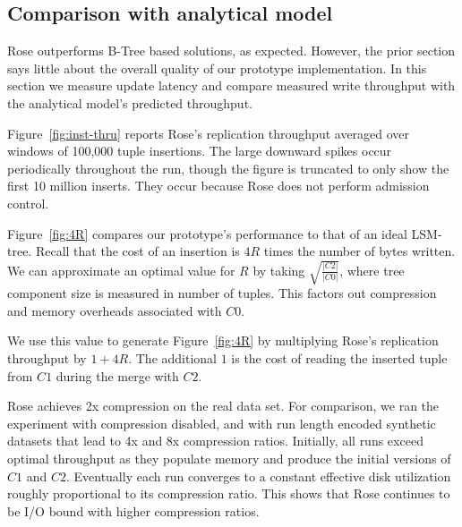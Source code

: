 \documentclass{vldb}
\newcommand{\rows}{Rose\xspace}
\newcommand{\rowss}{Rose's\xspace}
\begin{document}

\subsection{Comparison with analytical model}

\rows outperforms B-Tree based solutions, as expected.  However, the
prior section says little about the overall quality of our prototype
implementation.  In this section we measure update latency and compare
measured write throughput with the analytical model's predicted
throughput.

Figure~\ref{fig:inst-thru} reports \rowss replication throughput
averaged over windows of 100,000 tuple insertions.  The large downward
spikes occur periodically throughout the run, though the
figure is truncated to only show the first 10 million inserts.  They
occur because \rows does not perform admission control.


Figure~\ref{fig:4R} compares our prototype's performance to that of an
ideal LSM-tree.  Recall that the cost of an insertion is $4R$ times
the number of bytes written.  We can approximate an optimal value for
$R$ by taking $\sqrt{\frac{|C2|}{|C0|}}$, where tree component size is
measured in number of tuples.  This factors out compression and memory
overheads associated with $C0$.

We use this value to
generate Figure~\ref{fig:4R} by multiplying \rowss replication
throughput by $1 + 4R$.  The additional $1$ is the cost of reading the
inserted tuple from $C1$ during the merge with $C2$.

\rows achieves 2x compression on the real data set.  For comparison,
we ran the experiment with compression disabled, and with
run length encoded synthetic datasets that lead to 4x and 8x compression
ratios.  Initially, all runs exceed optimal throughput as they
populate memory and produce the initial versions of $C1$ and $C2$.
Eventually each run converges to a constant effective disk
utilization roughly proportional to its compression ratio.  This shows
that \rows continues to be I/O bound with higher compression ratios.
\end{document}
